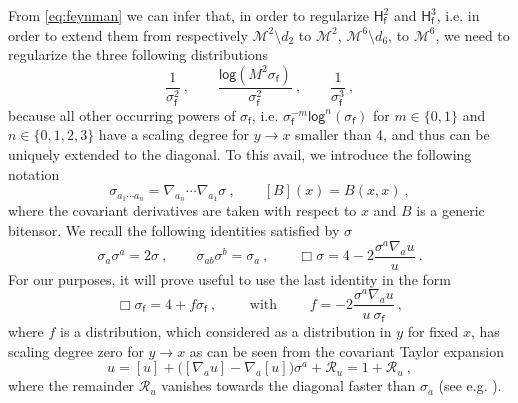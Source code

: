 \documentclass[11pt]{book}
\renewcommand{\log}{\mathsf{log}}
\newcommand{\Mcal}{\mathcal{M}}
\newcommand{\Rcal}{\mathcal{R}}
\newcommand{\Hsf}{\mathsf{H}}
\newcommand{\fsf}{\mathsf{f}}
\theoremstyle{break}
\begin{document}
From \eqref{eq:feynman} we can infer that, in order to regularize $\Hsf^2_\fsf$ and $\Hsf^3_\fsf$, i.e. in order to extend them from respectively $\Mcal^2 \setminus d_2$ to $\Mcal^2$, $\Mcal^6 \setminus d_6$, to $\Mcal^6$, we need to regularize the three following distributions
%
\begin{equation}
\frac{1}{\sigma_\fsf^2} \ , \qquad \frac{\log \left(M^2 \sigma_\fsf\right)}{\sigma_\fsf^2} \ , \qquad \frac{1}{\sigma_\fsf^3} \ ,
\label{eq:sigma_problematic}
\end{equation}
%
because all other occurring powers of $\sigma_\fsf$, i.e. $\sigma^{-m}_\fsf\log^n(\sigma_\fsf)$ for $m\in\{0,1\}$ and $n\in\{0,1,2,3\}$ have a scaling degree for $y\to x$ smaller than 4, and thus can be uniquely extended to the diagonal. To this avail, we introduce the following notation
%
\begin{equation*}
\sigma_{a_1\cdots a_n} = \nabla_{a_n} \cdots \nabla_{a_1} \sigma \ , \qquad [B](x) = B(x,x) \ , 
\end{equation*}
%
where the covariant derivatives are taken with respect to $x$ and $B$ is a generic bitensor. We recall the following identities satisfied by $\sigma$ 
%
\begin{equation}
\sigma_a \sigma^a = 2 \sigma \ , \qquad 
\sigma_{ab} \sigma^b = \sigma_a \ , \qquad 
\Box \sigma = 4 - 2 \frac{\sigma^a \nabla_a u}{u} \ .
\label{eq:sigma_identities}
\end{equation}
%
For our purposes, it will prove useful to use the last identity in the form
%
\begin{equation*}
\Box \sigma_\fsf = 4 + f \sigma_\fsf \ , \qquad
\mbox{ with } \qquad f = - 2 \frac{\sigma^a \nabla_a u}{u \ \sigma_\fsf} \ ,
\label{eq:def_f_sigma}
\end{equation*}
%
where $f$ is a distribution, which considered as a distribution in $y$ for fixed $x$, has scaling degree zero for $y \to x$ as can be seen from the covariant Taylor expansion
%
\begin{equation*}
u = [u] + \bigg( [\nabla_a u] - \nabla_a [u] \bigg) \sigma^a + \Rcal_u = 1 + \Rcal_u \ , 
\end{equation*}
%
where the remainder $\Rcal_u$ vanishes towards the diagonal faster than $\sigma_a$  (see e.g. \cite{PPV_2011}).
\end{document}
